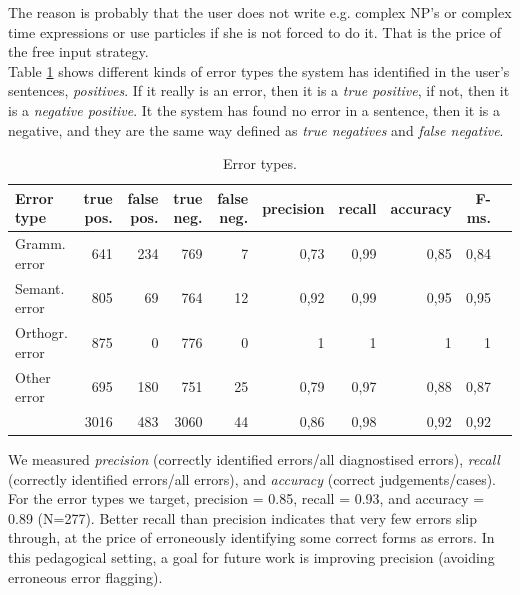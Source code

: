 \documentclass[11pt]{article}
\begin{document}
The reason is probably that the user does not write e.g. complex NP's or complex time expressions or use particles if she is not forced to do it. That is the price of the free input strategy.  \\

Table \ref{errortypes} shows different kinds of error types the system has identified in the user's sentences, \textit{positives}. If it really is an error, then it is a \textit{true positive}, if not, then it is a \textit{negative positive}. It the system has found no error in a sentence, then it is a negative, and they are the same way defined as \textit{true negatives} and \textit{false negative}. \\

\begin{table}[hbtp]
\begin{center}
\begin{tabular}{|l|r|r|r|r||r|r|r|r|r|}
\hline
Error type	& true pos.		& false pos.		& true neg.		& false neg.	& precision	 & recall	& accuracy	& F-ms. \\
\hline
Gramm. error    &   641   &   234   &   769    &   7    &   0,73   &   0,99   &   0,85   &   0,84	  \\
Semant. error       &   805   &   69    &   764    &   12   &   0,92   &   0,99   &   0,95   &   0,95		  \\
Orthogr. error      &   875   &   0     &   776    &   0    &   1      &   1      &   1      &   1					  \\
Other error     &   695   &   180   &   751    &   25   &   0,79   &   0,97   &   0,88   &   0,87	  \\
\hline
  &   3016  &   483   &   3060   &   44   &   0,86   &   0,98   &   0,92   &   0,92			  \\
\hline
\end{tabular}
\caption{Error types.}
\label{errortypes}
\end{center}
\end{table}%

We measured \textit{precision} (correctly identified errors/all diagnostised errors), \textit{recall} (correctly identified errors/all errors), and \textit{accuracy} (correct judgements/cases). For the error types we target, precision = 0.85, recall = 0.93, and accuracy = 0.89 (N=277). Better recall than precision indicates that very few errors slip through, at the price of erroneously identifying some correct forms as errors. In this pedagogical setting, a goal for future work is improving precision (avoiding erroneous error flagging).
\end{document}
